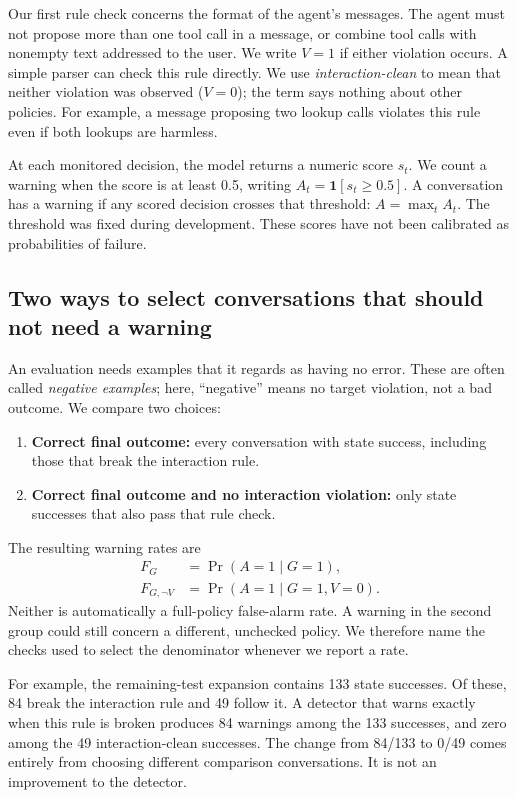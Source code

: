 \documentclass[10pt]{article}
\newcommand{\ind}{\mathbf{1}}
\begin{document}
Our first rule check concerns the format of the agent's messages. The agent must not propose more than one tool call in a message, or combine tool calls with nonempty text addressed to the user. We write $V=1$ if either violation occurs. A simple parser can check this rule directly. We use \emph{interaction-clean} to mean that neither violation was observed ($V=0$); the term says nothing about other policies. For example, a message proposing two lookup calls violates this rule even if both lookups are harmless.

At each monitored decision, the model returns a numeric score $s_t$. We count a warning when the score is at least 0.5, writing $A_t=\ind[s_t\geq0.5]$. A conversation has a warning if any scored decision crosses that threshold: $A=\max_t A_t$. The threshold was fixed during development. These scores have not been calibrated as probabilities of failure.

\subsection{Two ways to select conversations that should not need a warning}
An evaluation needs examples that it regards as having no error. These are often called \emph{negative examples}; here, ``negative'' means no target violation, not a bad outcome. We compare two choices:
\begin{enumerate}
\item \textbf{Correct final outcome:} every conversation with state success, including those that break the interaction rule.
\item \textbf{Correct final outcome and no interaction violation:} only state successes that also pass that rule check.
\end{enumerate}
The resulting warning rates are
\begin{align}
 F_G &= \Pr(A=1\mid G=1),\\
 F_{G,\neg V} &= \Pr(A=1\mid G=1,V=0).
\end{align}
Neither is automatically a full-policy false-alarm rate. A warning in the second group could still concern a different, unchecked policy. We therefore name the checks used to select the denominator whenever we report a rate.

For example, the remaining-test expansion contains 133 state successes. Of these, 84 break the interaction rule and 49 follow it. A detector that warns exactly when this rule is broken produces 84 warnings among the 133 successes, and zero among the 49 interaction-clean successes. The change from 84/133 to 0/49 comes entirely from choosing different comparison conversations. It is not an improvement to the detector.
\end{document}
